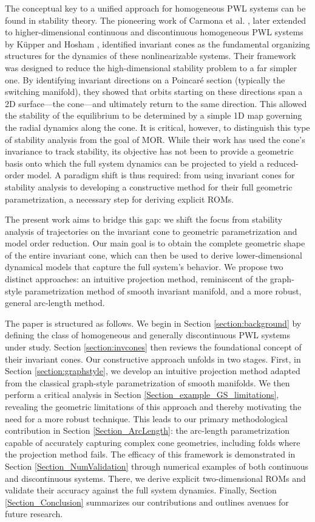 \documentclass[a4paper,9pt,parskip=half,english]{article}
\theoremstyle{plain}
\theoremstyle{definition}
\begin{document}
The conceptual key to a unified approach for homogeneous PWL systems can be found in stability theory. The pioneering work of Carmona et al. \cite{carmona2005bifurcation}, later extended to higher-dimensional continuous and discontinuous homogeneous PWL systems by Küpper and Hosham \cite{Kuepper2008, Kuepper2011, Hosham2016}, identified invariant cones as the fundamental organizing structures for the dynamics of these nonlinearizable systems. Their framework was designed to reduce the high-dimensional stability problem to a far simpler one. By identifying invariant directions on a Poincaré section (typically the switching manifold), they showed that orbits starting on these directions span a 2D surface—the cone—and ultimately return to the same direction. This allowed the stability of the equilibrium to be determined by a simple 1D map governing the radial dynamics along the cone.
It is critical, however, to distinguish this type of stability analysis from the goal of MOR. While their work has used the cone's invariance to track stability, its objective has not been to provide a geometric basis onto which the full system dynamics can be projected to yield a reduced-order model. A paradigm shift is thus required: from using invariant cones for stability analysis to developing a constructive method for their full geometric parametrization, a necessary step for deriving explicit ROMs.

The present work aims to bridge this gap: we shift the focus from stability analysis of trajectories on the invariant cone to geometric parametrization and model order reduction. Our main goal is to obtain the complete geometric shape of the entire invariant cone, which can then be used to derive lower-dimensional dynamical models that capture the full system's behavior. We propose two distinct approaches: an intuitive projection method, reminiscent of the graph-style parametrization method of smooth invariant manifold, and a more robust, general arc-length method.

The paper is structured as follows. We begin in Section \ref{section:background} by defining the class of homogeneous and generally discontinuous PWL systems under study. Section \ref{section:invcones} then reviews the foundational concept of their invariant cones. Our constructive approach unfolds in two stages. First, in Section \ref{section:graphstyle}, we develop an intuitive projection method adapted from the classical graph-style parametrization of smooth manifolds. We then perform a critical analysis in Section \ref{Section_example_GS_limitations}, revealing the geometric limitations of this approach and thereby motivating the need for a more robust technique. This leads to our primary methodological contribution in Section \ref{Section_ArcLength}: the arc-length parametrization capable of accurately capturing complex cone geometries, including folds where the projection method fails. The efficacy of this framework is demonstrated in Section \ref{Section_NumValidation} through numerical examples of both continuous and discontinuous systems. There, we derive explicit two-dimensional ROMs and validate their accuracy against the full system dynamics. Finally, Section \ref{Section_Conclusion} summarizes our contributions and outlines avenues for future research.
\end{document}

